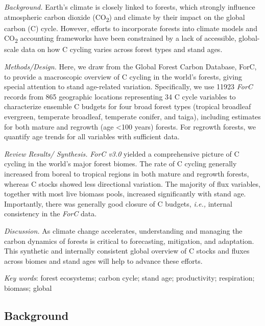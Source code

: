 \documentclass[
]{article}
\begin{document}
\emph{Background.} Earth's climate is closely linked to forests, which
strongly influence atmospheric carbon dioxide (CO\textsubscript{2}) and
climate by their impact on the global carbon (C) cycle. However, efforts
to incorporate forests into climate models and CO\textsubscript{2}
accounting frameworks have been constrained by a lack of accessible,
global-scale data on how C cycling varies across forest types and stand
ages.

\emph{Methods/Design.} Here, we draw from the Global Forest Carbon
Database, ForC, to provide a macroscopic overview of C cycling in the
world's forests, giving special attention to stand age-related
variation. Specifically, we use 11923 \emph{ForC} records from 865
geographic locations representing 34 C cycle variables to characterize
ensemble C budgets for four broad forest types (tropical broadleaf
evergreen, temperate broadleaf, temperate conifer, and taiga), including
estimates for both mature and regrowth (age \textless100 years) forests.
For regrowth forests, we quantify age trends for all variables with
sufficient data.

\emph{Review Results/ Synthesis.} \emph{ForC v3.0} yielded a
comprehensive picture of C cycling in the world's major forest biomes.
The rate of C cycling generally increased from boreal to tropical
regions in both mature and regrowth forests, whereas C stocks showed
less directional variation. The majority of flux variables, together
with most live biomass pools, increased significantly with stand age.
Importantly, there was generally good closure of C budgets, \emph{i.e.,}
internal consistency in the \emph{ForC} data.

\emph{Discussion.} As climate change accelerates, understanding and
managing the carbon dynamics of forests is critical to forecasting,
mitigation, and adaptation. This synthetic and internally consistent
global overview of C stocks and fluxes across biomes and stand ages will
help to advance these efforts.

\emph{Key words}: forest ecosystems; carbon cycle; stand age;
productivity; respiration; biomass; global

\newpage

\hypertarget{background}{%
\subsection{Background}\label{background}}
\end{document}
